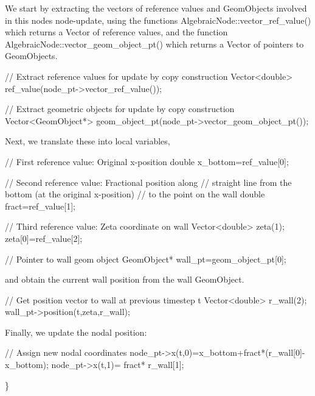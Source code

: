 We start by extracting the vectors of reference values and {\ttfamily Geom\+Objects} involved in this node\textquotesingle{}s node-\/update, using the functions {\ttfamily Algebraic\+Node\+::vector\+\_\+ref\+\_\+value()} which returns a Vector of reference values, and the function {\ttfamily Algebraic\+Node\+::vector\+\_\+geom\+\_\+object\+\_\+pt()} which returns a Vector of pointers to {\ttfamily Geom\+Objects}.


\begin{DoxyCodeInclude}
 \textcolor{comment}{// Extract reference values for update by copy construction}
 Vector<double> ref\_value(node\_pt->vector\_ref\_value());

 \textcolor{comment}{// Extract geometric objects for update by copy construction}
 Vector<GeomObject*> geom\_object\_pt(node\_pt->vector\_geom\_object\_pt());

\end{DoxyCodeInclude}


Next, we translate these into local variables,


\begin{DoxyCodeInclude}
 \textcolor{comment}{// First reference value: Original x-position }
 \textcolor{keywordtype}{double} x\_bottom=ref\_value[0];
 
 \textcolor{comment}{// Second reference value: Fractional position along }
 \textcolor{comment}{// straight line from the bottom (at the original x-position)}
 \textcolor{comment}{// to the point on the wall}
 \textcolor{keywordtype}{double} fract=ref\_value[1];
 
 \textcolor{comment}{// Third reference value: Zeta coordinate on wall}
 Vector<double> zeta(1);
 zeta[0]=ref\_value[2];
     
 \textcolor{comment}{// Pointer to wall geom object}
 GeomObject* wall\_pt=geom\_object\_pt[0];

\end{DoxyCodeInclude}


and obtain the current wall position from the wall {\ttfamily Geom\+Object}.


\begin{DoxyCodeInclude}
 \textcolor{comment}{// Get position vector to wall at previous timestep t}
 Vector<double> r\_wall(2);
 wall\_pt->position(t,zeta,r\_wall);

\end{DoxyCodeInclude}


Finally, we update the nodal position\+:


\begin{DoxyCodeInclude}
 \textcolor{comment}{// Assign new nodal coordinates}
 node\_pt->x(t,0)=x\_bottom+fract*(r\_wall[0]-x\_bottom);
 node\_pt->x(t,1)=         fract* r\_wall[1];

\}

\end{DoxyCodeInclude}


